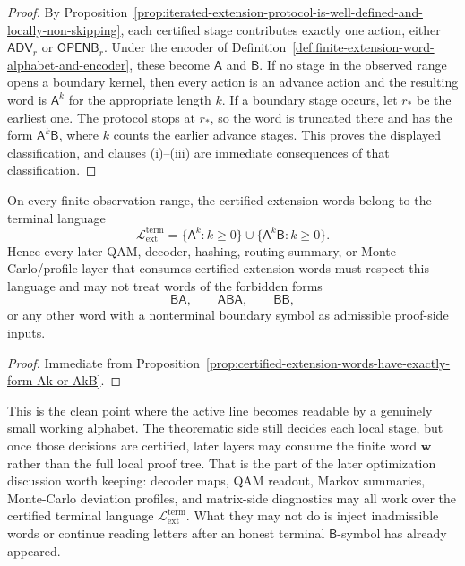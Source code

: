 \begin{proof}
By Proposition~\ref{prop:iterated-extension-protocol-is-well-defined-and-locally-non-skipping}, each certified stage contributes exactly one action, either \(\mathsf{ADV}_r\) or \(\mathsf{OPENB}_r\). Under the encoder of Definition~\ref{def:finite-extension-word-alphabet-and-encoder}, these become \(\mathsf A\) and \(\mathsf B\). If no stage in the observed range opens a boundary kernel, then every action is an advance action and the resulting word is \(\mathsf A^k\) for the appropriate length \(k\). If a boundary stage occurs, let \(r_*\) be the earliest one. The protocol stops at \(r_*\), so the word is truncated there and has the form \(\mathsf A^k\mathsf B\), where \(k\) counts the earlier advance stages. This proves the displayed classification, and clauses (i)--(iii) are immediate consequences of that classification.
\end{proof}

\begin{corollary}
\label{cor:extension-protocol-defines-regular-terminal-word-language}
On every finite observation range, the certified extension words belong to the terminal language
\[
  \mathcal L_{\mathrm{ext}}^{\mathrm{term}}
  =
  \{\mathsf A^k : k\ge 0\}
  \cup
  \{\mathsf A^k\mathsf B : k\ge 0\}.
\]
Hence every later QAM, decoder, hashing, routing-summary, or Monte-Carlo/profile layer that consumes certified extension words must respect this language and may not treat words of the forbidden forms
\[
  \mathsf B\mathsf A,\qquad \mathsf A\mathsf B\mathsf A,\qquad \mathsf B\mathsf B,
\]
or any other word with a nonterminal boundary symbol as admissible proof-side inputs.
\end{corollary}

\begin{proof}
Immediate from Proposition~\ref{prop:certified-extension-words-have-exactly-form-Ak-or-AkB}.
\end{proof}

\begin{remark}
\label{rem:what-this-word-form-now-buys}
This is the clean point where the active line becomes readable by a genuinely small working alphabet. The theorematic side still decides each local stage, but once those decisions are certified, later layers may consume the finite word \(\mathbf w\) rather than the full local proof tree. That is the part of the later optimization discussion worth keeping: decoder maps, QAM readout, Markov summaries, Monte-Carlo deviation profiles, and matrix-side diagnostics may all work over the certified terminal language \(\mathcal L_{\mathrm{ext}}^{\mathrm{term}}\). What they may not do is inject inadmissible words or continue reading letters after an honest terminal \(\mathsf B\)-symbol has already appeared.
\end{remark}



